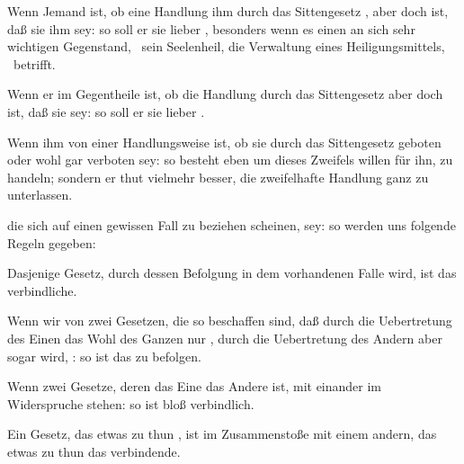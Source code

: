 \begin{aufza}
\item Wenn Jemand  ist, ob eine Handlung ihm durch das Sittengesetz , aber doch  ist, daß sie ihm  sey: so soll er sie lieber , besonders wenn es einen an sich sehr wichtigen Gegenstand, \zB\  sein Seelenheil, die Verwaltung eines Heiligungsmittels, \udgl\  betrifft.
\item Wenn er im Gegentheile  ist, ob die Handlung durch das Sittengesetz  aber doch ist, daß sie  sey: so soll er sie lieber .
\item Wenn ihm von einer Handlungsweise  ist, ob sie durch das Sittengesetz geboten oder wohl gar verboten sey: so besteht eben um dieses Zweifels willen  für ihn, zu handeln; sondern er thut vielmehr besser, die zweifelhafte Handlung ganz zu unterlassen.
\item {} die sich auf einen gewissen Fall zu beziehen scheinen,  sey: so werden uns folgende Regeln gegeben:
\begin{aufzb}
\item Dasjenige Gesetz, durch dessen Befolgung in dem vorhandenen Falle  wird, ist das verbindliche.~
\item Wenn wir von zwei Gesetzen, die so beschaffen sind, daß durch die Uebertretung des Einen das Wohl des Ganzen nur , durch die Uebertretung des Andern aber sogar  wird, : so ist das  zu befolgen.
\item Wenn zwei Gesetze, deren das Eine  das Andere  ist, mit einander im Widerspruche stehen: so ist bloß  verbindlich.
\item Ein Gesetz, das etwas zu thun , ist im Zusammenstoße mit einem andern, das etwas zu thun  das verbindende.
\end{aufzb}
\end{aufza}

